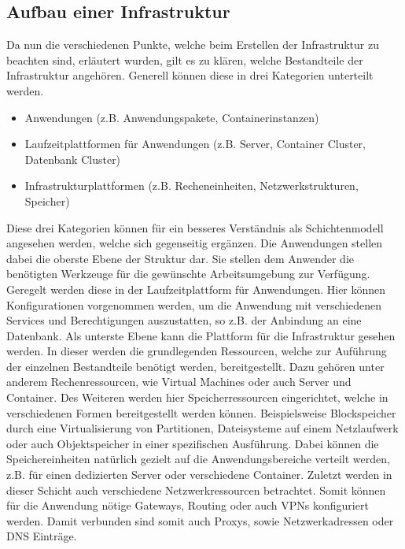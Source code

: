 \documentclass[biblatex]{lni}
\begin{document}
\subsection{Aufbau einer Infrastruktur}
Da nun die verschiedenen Punkte, welche beim Erstellen der Infrastruktur zu beachten sind, erläutert wurden, gilt es zu klären, welche Bestandteile der Infrastruktur angehören. Generell können diese in drei Kategorien unterteilt werden.
\begin{itemize}
    \item Anwendungen (z.B. Anwendungspakete, Containerinstanzen)
    \item Laufzeitplattformen für Anwendungen (z.B. Server, Container Cluster, Datenbank Cluster)
    \item Infrastrukturplattformen (z.B. Recheneinheiten, Netzwerkstrukturen, Speicher)
\end{itemize}
Diese drei Kategorien können für ein besseres Verständnis als Schichtenmodell angesehen werden, welche sich gegenseitig ergänzen. Die Anwendungen stellen dabei die oberste Ebene der Struktur dar. Sie stellen dem Anwender die benötigten Werkzeuge für die gewünschte Arbeitsumgebung zur Verfügung. Geregelt werden diese in der Laufzeitplattform für Anwendungen. Hier können Konfigurationen vorgenommen werden, um die Anwendung mit verschiedenen Services und Berechtigungen auszustatten, so z.B. der Anbindung an eine Datenbank. Als unterste Ebene kann die Plattform für die Infrastruktur gesehen werden. In dieser werden die grundlegenden Ressourcen, welche zur Auführung der einzelnen Bestandteile benötigt werden, bereitgestellt. Dazu gehören unter anderem Rechenressourcen, wie Virtual Machines oder auch Server und Container. Des Weiteren werden hier Speicherressourcen eingerichtet, welche in verschiedenen Formen bereitgestellt werden können. Beispielsweise Blockspeicher durch eine Virtualisierung von Partitionen, Dateisysteme auf einem Netzlaufwerk oder auch Objektspeicher in einer spezifischen Ausführung. Dabei können die Speichereinheiten natürlich gezielt auf die Anwendungsbereiche verteilt werden, z.B. für einen dedizierten Server oder verschiedene Container. Zuletzt werden in dieser Schicht auch verschiedene Netzwerkressourcen betrachtet. Somit können für die Anwendung nötige Gateways, Routing oder auch VPNs konfiguriert werden. Damit verbunden sind somit auch Proxys, sowie Netzwerkadressen oder DNS Einträge.
\end{document}
